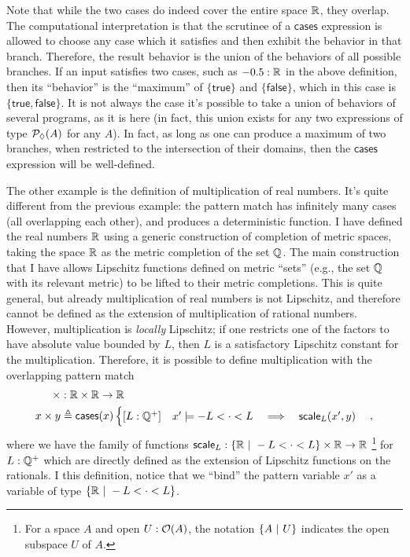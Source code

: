 Note that while the two cases do indeed cover the entire space $\mathbb{R}$, they overlap. The computational interpretation is that the scrutinee of a $\mathsf{cases}$ expression is allowed to choose any case which it satisfies and then exhibit the behavior in that branch. Therefore, the result behavior is the union of the behaviors of all possible branches. If an input satisfies two cases, such as $-0.5 : \mathbb{R}$ in the above definition, then its ``behavior'' is the ``maximum'' of $\{ \mathsf{true} \}$ and $\{ \mathsf{false} \}$, which in this case is $\{ \mathsf{true}, \mathsf{false} \}$. It is not always the case it's possible to take a union of behaviors of several programs, as it is here (in fact, this union exists for any two expressions of type $\mathcal{P}_\lozenge(A)$ for any $A$). In fact, as long as one can produce a maximum of two branches, when restricted to the intersection of their domains, then the $\mathsf{cases}$ expression will be well-defined.

The other example is the definition of multiplication of real numbers. It's quite different from the previous example: the pattern match has infinitely many cases (all overlapping each other), and produces a deterministic function. I have defined the real numbers $\mathbb{R}$ using a generic construction of completion of metric spaces, taking the space $\mathbb{R}$ as the metric completion of the set $\mathbb{Q}$. The main construction that I have allows Lipschitz functions defined on metric ``sets'' (e.g., the set $\mathbb{Q}$ with its relevant metric) to be lifted to their metric completions. This is quite general, but already multiplication of real numbers is not Lipschitz, and therefore cannot be defined as the extension of multiplication of rational numbers. However, multiplication is \emph{locally} Lipschitz; if one restricts one of the factors to have absolute value bounded by $L$, then $L$ is a satisfactory Lipschitz constant for the multiplication. Therefore, it is possible to define multiplication with the overlapping pattern match
\begin{align*}
\times &: \mathbb{R} \times \mathbb{R} \to \mathbb{R}
\\ x \times y &\triangleq
\mathsf{cases}(x)
\begin{cases}
[L : \mathbb{Q}^+] \quad x' \models -L < \cdot < L \quad \Longrightarrow \quad \mathsf{scale}_L(x', y)
\end{cases},
\end{align*}
where we have the family of functions $\mathsf{scale}_L : \{ \mathbb{R} \ |\  -L < \cdot < L \} \times \mathbb{R} \to \mathbb{R}$ \footnote{For a space $A$ and open $U : \mathcal{O}({A})$, the notation $\{ A \ |\  U \}$ indicates the open subspace $U$ of $A$.}
for $L : \mathbb{Q}^+$ which are directly defined as the extension of Lipschitz functions on the rationals. I this definition, notice that we ``bind'' the pattern variable $x'$ as a variable of type $\{ \mathbb{R} \ |\  -L < \cdot < L \}$.

